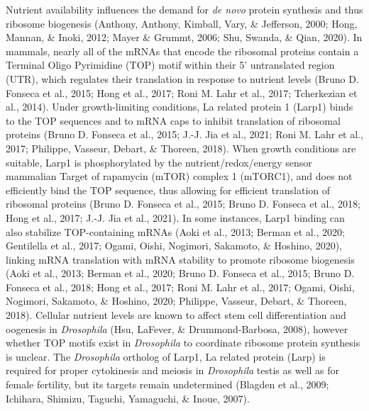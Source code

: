 \documentclass[12pt,oneside]{reedthesis}
\begin{document}
Nutrient availability influences the demand for \emph{de novo} protein
synthesis and thus ribosome biogenesis
(Anthony, Anthony, Kimball, Vary, \& Jefferson, 2000; Hong, Mannan, \& Inoki, 2012; Mayer \& Grummt, 2006; Shu, Swanda, \& Qian, 2020). In mammals, nearly all of the mRNAs that
encode the ribosomal proteins contain a Terminal Oligo Pyrimidine (TOP)
motif within their 5' untranslated region (UTR), which regulates their
translation in response to nutrient levels (Bruno D. Fonseca et al., 2015; Hong et al., 2017; Roni M. Lahr et al., 2017; Tcherkezian et al., 2014). Under growth-limiting
conditions, La related protein 1 (Larp1) binds to the TOP sequences and
to mRNA caps to inhibit translation of ribosomal proteins
(Bruno D. Fonseca et al., 2015; J.-J. Jia et al., 2021; Roni M. Lahr et al., 2017; Philippe, Vasseur, Debart, \& Thoreen, 2018). When growth conditions are
suitable, Larp1 is phosphorylated by the nutrient/redox/energy sensor
mammalian Target of rapamycin (mTOR) complex 1 (mTORC1), and does not
efficiently bind the TOP sequence, thus allowing for efficient
translation of ribosomal proteins (Bruno D. Fonseca et al., 2015; Bruno D. Fonseca et al., 2018; Hong et al., 2017; J.-J. Jia et al., 2021). In some instances, Larp1 binding can also
stabilize TOP-containing mRNAs (Aoki et al., 2013; Berman et al., 2020; Gentilella et al., 2017; Ogami, Oishi, Nogimori, Sakamoto, \& Hoshino, 2020), linking mRNA translation
with mRNA stability to promote ribosome biogenesis
(Aoki et al., 2013; Berman et al., 2020; Bruno D. Fonseca et al., 2015; Bruno D. Fonseca et al., 2018; Hong et al., 2017; Roni M. Lahr et al., 2017; Ogami, Oishi, Nogimori, Sakamoto, \& Hoshino, 2020; Philippe, Vasseur, Debart, \& Thoreen, 2018). Cellular nutrient levels are
known to affect stem cell differentiation and oogenesis in \emph{Drosophila}
(Hsu, LaFever, \& Drummond-Barbosa, 2008), however whether TOP motifs exist in
\emph{Drosophila} to coordinate ribosome protein synthesis is unclear. The
\emph{Drosophila} ortholog of Larp1, La related protein (Larp) is required
for proper cytokinesis and meiosis in \emph{Drosophila} testis as well as for
female fertility, but its targets remain undetermined (Blagden et al., 2009; Ichihara, Shimizu, Taguchi, Yamaguchi, \& Inoue, 2007).
\end{document}
